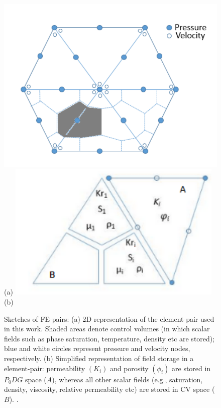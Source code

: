 \begin{figure}[ht] 
\vbox{
\hbox{\hspace{1cm}\includegraphics[width=.7\textwidth]{./Pics/P1DGP2}}
\hbox{\hspace{6cm}(a)}
\vspace{.5cm}
\hbox{\hspace{1cm}\includegraphics[width=.7\textwidth]{./Pics/element_n}}
\hbox{\hspace{6cm}(b)}}
\caption{Sketches of FE-pairs: (a) 2D representation of the  element-pair used in this work. Shaded areas denote control volumes (in which scalar fields such as phase saturation, temperature, density etc are stored); blue and white circles represent pressure and velocity nodes, respectively. (b) Simplified representation of field storage in a  element-pair: permeability $\left(K_{i}\right)$ and porosity $\left(\phi_{i}\right)$ are stored in $P_{0}DG$ space ($A$), whereas all other scalar fields (e.g., saturation, density, viscosity, relative permeability etc) are stored in CV space ($B$). .}
\label{fig:fem_cv}
\end{figure}

